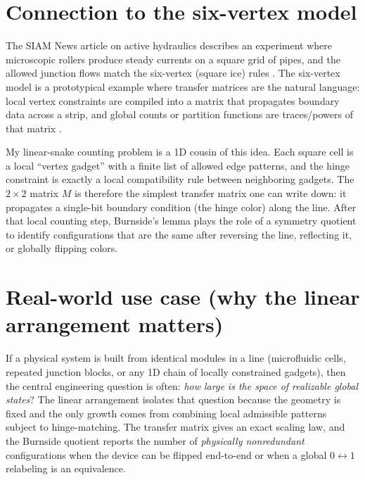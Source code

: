 \documentclass[12pt]{article}
\theoremstyle{definition}
\begin{document}
\section{Connection to the six-vertex model}
The SIAM News article on active hydraulics describes an experiment where microscopic rollers produce steady currents on a square grid of pipes, and the allowed junction flows match the six-vertex (square ice) rules \cite{FrancisSIAM2025,JorgeBartoloPRL2025}. The six-vertex model is a prototypical example where transfer matrices are the natural language: local vertex constraints are compiled into a matrix that propagates boundary data across a strip, and global counts or partition functions are traces/powers of that matrix \cite{LiebPhysRev1967,SutherlandPRL1967,BaxterBook1982}.

My linear-snake counting problem is a 1D cousin of this idea. Each square cell is a local ``vertex gadget'' with a finite list of allowed edge patterns, and the hinge constraint is exactly a local compatibility rule between neighboring gadgets. The \(2\times 2\) matrix \(M\) is therefore the simplest transfer matrix one can write down: it propagates a single-bit boundary condition (the hinge color) along the line. After that local counting step, Burnside's lemma plays the role of a symmetry quotient to identify configurations that are the same after reversing the line, reflecting it, or globally flipping colors.

\section{Real-world use case (why the linear arrangement matters)}
If a physical system is built from identical modules in a line (microfluidic cells, repeated junction blocks, or any 1D chain of locally constrained gadgets), then the central engineering question is often: \emph{how large is the space of realizable global states}? The linear arrangement isolates that question because the geometry is fixed and the only growth comes from combining local admissible patterns subject to hinge-matching. The transfer matrix gives an exact scaling law, and the Burnside quotient reports the number of \emph{physically nonredundant} configurations when the device can be flipped end-to-end or when a global \(0\leftrightarrow 1\) relabeling is an equivalence.



\end{document}
